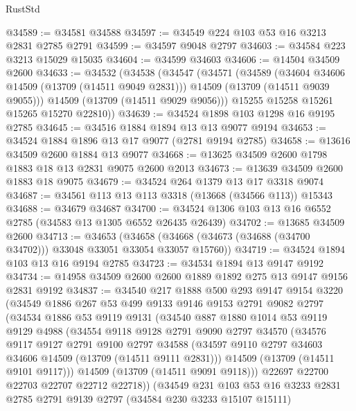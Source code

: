 \begin{lexlean}{RustStd}
\begin{coremodule}
@34589 := @34581 @34588
@34597 := @34549 @224 @103 @53 @16 @3213 @2831 @2785 @2791
@34599 := @34597 @9048 @2797
@34603 := @34584 @223 @3213 @15029 @15035
@34604 := @34599 @34603
@34606 := @14504 @34509 @2600
@34633 := @34532
    (@34538
      (@34547
        (@34571
          (@34589
            (@34604 @34606 @14509 (@13709 (@14511 @9049 @2831)))
            @14509
            (@13709 (@14511 @9039 @9055)))
          @14509
          (@13709 (@14511 @9029 @9056)))
        @15255
        @15258
        @15261
        @15265
        @15270
        @22810))
@34639 := @34524 @1898 @103 @1298 @16 @9195 @2785
@34645 := @34516 @1884 @1894 @13 @13 @9077 @9194
@34653 := @34524 @1884 @1896 @13 @17 @9077 (@2781 @9194 @2785)
@34658 := @13616 @34509 @2600 @1884 @13 @9077
@34668 := @13625 @34509 @2600 @1798 @1883 @18 @13 @2831 @9075 @2600 @2013
@34673 := @13639 @34509 @2600 @1883 @18 @9075
@34679 := @34524 @264 @1379 @13 @17 @3318 @9074
@34687 := @34561 @113 @13 @113 @3318 (@13668 (@34566 @113)) @15343
@34688 := @34679 @34687
@34700 := @34524 @1306 @103 @13 @16 @6552 @2785 (@34583 @13 @1305 @6552 @26435 @26439)
@34702 := @13685 @34509 @2600
@34713 := @34653
    (@34658 (@34668 (@34673 (@34688 (@34700 @34702))) @33048 @33051 @33054 @33057 @15760))
@34719 := @34524 @1894 @103 @13 @16 @9194 @2785
@34723 := @34534 @1894 @13 @9147 @9192
@34734 := @14958 @34509 @2600 @2600 @1889 @1892 @275 @13 @9147 @9156 @2831 @9192
@34837 := @34540
    @217
    @1888
    @500
    @293
    @9147
    @9154
    @3220
    (@34549
      @1886
      @267
      @53
      @499
      @9133
      @9146
      @9153
      @2791
      @9082
      @2797
      (@34534
        @1886
        @53
        @9119
        @9131
        (@34540
          @887
          @1880
          @1014
          @53
          @9119
          @9129
          @4988
          (@34554
            @9118
            @9128
            @2791
            @9090
            @2797
            @34570
            (@34576
              @9117
              @9127
              @2791
              @9100
              @2797
              @34588
              (@34597 @9110 @2797 @34603 @34606 @14509 (@13709 (@14511 @9111 @2831)))
              @14509
              (@13709 (@14511 @9101 @9117)))
            @14509
            (@13709 (@14511 @9091 @9118)))
          @22697
          @22700
          @22703
          @22707
          @22712
          @22718))
      (@34549
        @231
        @103
        @53
        @16
        @3233
        @2831
        @2785
        @2791
        @9139
        @2797
        (@34584 @230 @3233 @15107 @15111)

\end{coremodule}
\end{lexlean}
